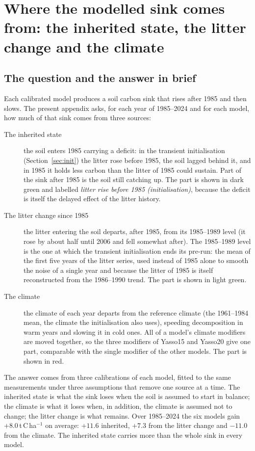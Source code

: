 \documentclass[../HIKET_draft_v1.tex]{subfiles}
\begin{document}
\section{Where the modelled sink comes from: the inherited state, the litter change and the climate}
\label{app:attribution}

\subsection{The question and the answer in brief}

Each calibrated model produces a soil carbon sink that rises after 1985 and then slows.
The present appendix asks, for each year of 1985--2024 and for each model, how much of
that sink comes from three sources:
\begin{description}
  \item[The inherited state] the soil enters 1985 carrying a deficit: in the transient
    initialisation (Section~\ref{sec:init}) the litter rose before 1985, the soil lagged
    behind it, and in 1985 it holds less carbon than the litter of 1985 could sustain.
    Part of the sink after 1985 is the soil still catching up. The part is shown in dark
    green and labelled \emph{litter rise before 1985 (initialisation)}, because the deficit
    is itself the delayed effect of the litter history.
  \item[The litter change since 1985] the litter entering the soil departs, after 1985,
    from its 1985--1989 level (it rose by about half until 2006 and fell somewhat after).
    The 1985--1989 level is the one at which the transient initialisation ends its
    pre-run: the mean of the first five years of the litter series, used instead of 1985
    alone to smooth the noise of a single year and because the litter of 1985 is itself
    reconstructed from the 1986--1990 trend. The part is shown in light green.
  \item[The climate] the climate of each year departs from the reference climate
    (the 1961--1984 mean, the climate the initialisation also uses), speeding
    decomposition in warm years and slowing it in cold ones. All of a model's climate
    modifiers are moved together, so the three modifiers of Yasso15 and Yasso20 give one
    part, comparable with the single modifier of the other models. The part is shown in
    red.
\end{description}
The answer comes from three calibrations of each model, fitted to the same measurements
under three assumptions that remove one source at a time. The inherited state is what the
sink loses when the soil is assumed to start in balance; the climate is what it loses when,
in addition, the climate is assumed not to change; the litter change is what remains. Over
1985--2024 the six models gain $+8.0$\,t\,C\,ha$^{-1}$ on average: $+11.6$ inherited, $+7.3$
from the litter change and $-11.0$ from the climate. The inherited state carries more than
the whole sink in every model.
\end{document}
